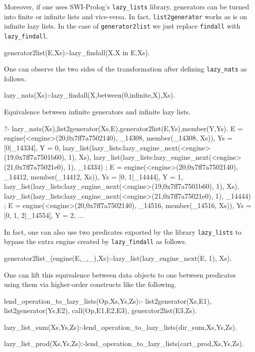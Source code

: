 \documentclass{new_tlp}
\begin{document}
Moreover, if one uses SWI-Prolog's {\tt lazy\_lists} library, generators can be turned into finite or infinite lists and vice-versa.
In fact, {\tt list2generator} works as is on infinite lazy lists. In the case of {\tt generator2list} we just replace {\tt findall} with {\tt lazy\_findall}.
\begin{code}
generator2list(E,Xs):-lazy_findall(X,X in E,Xs).
\end{code} 

One can observe the two sides of the transformation after defining {\tt lazy\_nats} as follows.
\begin{code}
lazy_nats(Xs):-lazy_findall(X,between(0,infinite,X),Xs).
\end{code}

\BX
Equivalence between infinite generators and infinite lazy lists.
\begin{codex}
?- lazy_nats(Xs),list2generator(Xs,E),generator2list(E,Ys),member(Y,Ys).
E = engine(<engine>(20,0x7ff7a7502140), _14308, member(_14308, Xs)),
Ys = [0|_14334],
Y = 0,
lazy_list(lazy_lists:lazy_engine_next(<engine>(19,0x7ff7a7501b60), 1), Xs),
lazy_list(lazy_lists:lazy_engine_next(<engine>(21,0x7ff7a75021e0), 1), _14334) ;
E = engine(<engine>(20,0x7ff7a7502140), _14412, member(_14412, Xs)),
Ys = [0, 1|_14444],
Y = 1,
lazy_list(lazy_lists:lazy_engine_next(<engine>(19,0x7ff7a7501b60), 1), Xs),
lazy_list(lazy_lists:lazy_engine_next(<engine>(21,0x7ff7a75021e0), 1), _14444) ;
E = engine(<engine>(20,0x7ff7a7502140), _14516, member(_14516, Xs)),
Ys = [0, 1, 2|_14554],
Y = 2,
...
\end{codex}
\EX
In fact, one can also use two predicates exported by the library {\tt lazy\_lists}
to bypass the extra engine created by {\tt lazy\_findall} as follows.
\begin{code}
generator2list_(engine(E,_,_),Xs):-lazy_list(lazy_engine_next(E, 1), Xs).
\end{code}

One can lift this equivalence between data objects to one between predicates using them via higher-order constructs like the following.

\begin{code}
lend_operation_to_lazy_lists(Op,Xs,Ys,Zs):-
  list2generator(Xs,E1),
  list2generator(Ys,E2),
  call(Op,E1,E2,E3),
  generator2list(E3,Zs).

lazy_list_sum(Xs,Ys,Zs):-lend_operation_to_lazy_lists(dir_sum,Xs,Ys,Zs).

lazy_list_prod(Xs,Ys,Zs):-lend_operation_to_lazy_lists(cart_prod,Xs,Ys,Zs).
\end{code}
\end{document}
